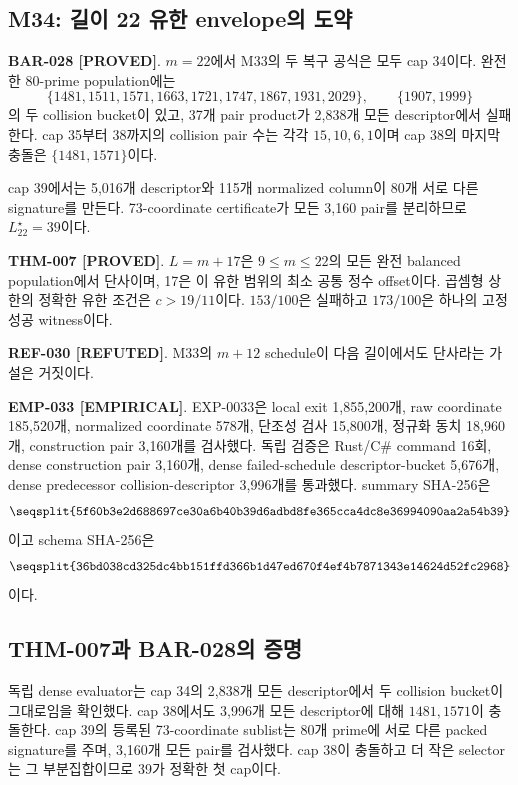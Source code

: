 \documentclass[11pt]{article}
\newcommand{\claimstatus}[2]{\textbf{#1 [#2]}}
\begin{document}
\subsection{M34: 길이 22 유한 envelope의 도약}

\claimstatus{BAR-028}{PROVED}.
\(m=22\)에서 M33의 두 복구 공식은 모두 cap 34이다. 완전한 80-prime
population에는
\[
\{1481,1511,1571,1663,1721,1747,1867,1931,2029\},
\qquad
\{1907,1999\}
\]
의 두 collision bucket이 있고, 37개 pair product가 2,838개 모든
descriptor에서 실패한다. cap 35부터 38까지의 collision pair 수는
각각 \(15,10,6,1\)이며 cap 38의 마지막 충돌은
\(\{1481,1571\}\)이다.

cap 39에서는 5,016개 descriptor와 115개 normalized column이 80개
서로 다른 signature를 만든다. 73-coordinate certificate가 모든
3,160 pair를 분리하므로 \(L_{22}^\star=39\)이다.

\claimstatus{THM-007}{PROVED}.
\(L=m+17\)은 \(9\le m\le22\)의 모든 완전 balanced population에서
단사이며, 17은 이 유한 범위의 최소 공통 정수 offset이다. 곱셈형
상한의 정확한 유한 조건은 \(c>19/11\)이다. \(153/100\)은 실패하고
\(173/100\)은 하나의 고정 성공 witness이다.

\claimstatus{REF-030}{REFUTED}.
M33의 \(m+12\) schedule이 다음 길이에서도 단사라는 가설은 거짓이다.

\claimstatus{EMP-033}{EMPIRICAL}.
EXP-0033은 local exit 1,855,200개, raw coordinate 185,520개,
normalized coordinate 578개, 단조성 검사 15,800개, 정규화 동치
18,960개, construction pair 3,160개를 검사했다. 독립 검증은
Rust/C\# command 16회, dense construction pair 3,160개, dense
failed-schedule descriptor-bucket 5,676개, dense predecessor
collision-descriptor 3,996개를 통과했다. summary SHA-256은
\[
\texttt{\seqsplit{5f60b3e2d688697ce30a6b40b39d6adbd8fe365cca4dc8e36994090aa2a54b39}}
\]
이고 schema SHA-256은
\[
\texttt{\seqsplit{36bd038cd325dc4bb151ffd366b1d47ed670f4ef4b7871343e14624d52fc2968}}
\]
이다.

\subsection{THM-007과 BAR-028의 증명}

독립 dense evaluator는 cap 34의 2,838개 모든 descriptor에서 두
collision bucket이 그대로임을 확인했다. cap 38에서도 3,996개 모든
descriptor에 대해 \(1481,1571\)이 충돌한다. cap 39의 등록된
73-coordinate sublist는 80개 prime에 서로 다른 packed signature를
주며, 3,160개 모든 pair를 검사했다. cap 38이 충돌하고 더 작은
selector는 그 부분집합이므로 39가 정확한 첫 cap이다.
\end{document}
